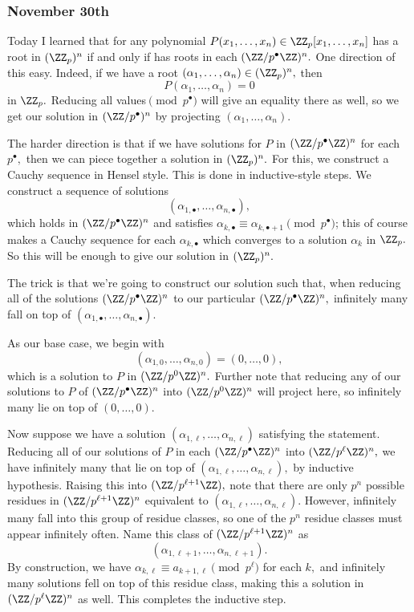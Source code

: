 \subsubsection{November 30th}
Today I learned that for any polynomial $P(x_1,\ldots,x_n)\in\ZZ_p[x_1,\ldots,x_n]$ has a root in $(\ZZ_p)^n$ if and only if has roots in each $(\ZZ/p^\bullet\ZZ)^n.$ One direction of this easy. Indeed, if we have a root $(\alpha_1,\ldots,\alpha_n)\in(\ZZ_p)^n,$ then
\[P(\alpha_1,\ldots,\alpha_n)=0\]
in $\ZZ_p.$ Reducing all values$\pmod{p^\bullet}$ will give an equality there as well, so we get our solution in $(\ZZ/p^\bullet)^n$ by projecting $(\alpha_1,\ldots,\alpha_n).$

The harder direction is that if we have solutions for $P$ in $(\ZZ/p^\bullet\ZZ)^n$ for each $p^\bullet,$ then we can piece together a solution in $(\ZZ_p)^n.$ For this, we construct a Cauchy sequence in Hensel style. This is done in inductive-style steps. We construct a sequence of solutions
\[(\alpha_{1,\bullet},\ldots,\alpha_{n,\bullet}),\]
which holds in $(\ZZ/p^\bullet\ZZ)^n$ and satisfies $\alpha_{k,\bullet}\equiv\alpha_{k,\bullet+1}\pmod{p^\bullet}$; this of course makes a Cauchy sequence for each $\alpha_{k,\bullet}$ which converges to a solution $\alpha_k$ in $\ZZ_p.$ So this will be enough to give our solution in $(\ZZ_p)^n.$

The trick is that we're going to construct our solution such that, when reducing all of the solutions $(\ZZ/p^\bullet\ZZ)^n$ to our particular $(\ZZ/p^\bullet\ZZ)^n,$ infinitely many fall on top of $(\alpha_{1,\bullet},\ldots,\alpha_{n,\bullet}).$

As our base case, we begin with
\[(\alpha_{1,0},\ldots,\alpha_{n,0})=(0,\ldots,0),\]
which is a solution to $P$ in $(\ZZ/p^0\ZZ)^n.$ Further note that reducing any of our solutions to $P$ of $(\ZZ/p^\bullet\ZZ)^n$ into $(\ZZ/p^0\ZZ)^n$ will project here, so infinitely many lie on top of $(0,\ldots,0).$

Now suppose we have a solution $(\alpha_{1,\ell},\ldots,\alpha_{n,\ell})$ satisfying the statement. Reducing all of our solutions of $P$ in each $(\ZZ/p^\bullet\ZZ)^n$ into $(\ZZ/p^\ell\ZZ)^n,$ we have infinitely many that lie on top of $(\alpha_{1,\ell},\ldots,\alpha_{n,\ell}),$ by inductive hypothesis. Raising this into $(\ZZ/p^{\ell+1}\ZZ),$ note that there are only $p^n$ possible residues in $(\ZZ/p^{\ell+1}\ZZ)^n$ equivalent to $(\alpha_{1,\ell},\ldots,\alpha_{n,\ell}).$ However, infinitely many fall into this group of residue classes, so one of the $p^n$ residue classes must appear infinitely often. Name this class of $(\ZZ/p^{\ell+1}\ZZ)^n$ as
\[(\alpha_{1,\ell+1},\ldots,\alpha_{n,\ell+1}).\]
By construction, we have $\alpha_{k,\ell}\equiv a_{k+1,\ell}\pmod{p^\ell}$ for each $k,$ and infinitely many solutions fell on top of this residue class, making this a solution in $(\ZZ/p^\ell\ZZ)^n$ as well. This completes the inductive step.

